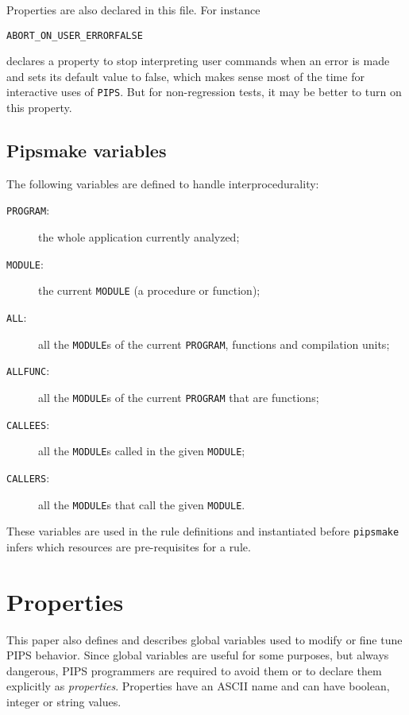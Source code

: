 \documentclass[a4paper]{report}
\begin{document}
Properties are also declared in this file. For instance
\begin{alltt}
ABORT_ON_USER_ERROR FALSE
\end{alltt}
declares a property to stop interpreting user commands when an error
is made and sets its default value to false, which makes sense most of
the time for interactive uses of {\tt PIPS}. But for non-regression
tests, it may be better to turn on this property.

\subsection{Pipsmake variables}
\label{sec:program-pieces}


The following variables are defined to handle interprocedurality:
\begin{description}
\item[\texttt{PROGRAM}:] the whole application currently analyzed;
\item[\texttt{MODULE}:] the current \texttt{MODULE} (a procedure or
  function);
\item[\texttt{ALL}:] all the \texttt{MODULE}s of the current
  \texttt{PROGRAM}, functions and compilation units;
\item[\texttt{ALLFUNC}:] all the \texttt{MODULE}s of the current
  \texttt{PROGRAM} that are functions;
\item[\texttt{CALLEES}:] all the \texttt{MODULE}s called in the given
  \texttt{MODULE};
\item[\texttt{CALLERS}:] all the \texttt{MODULE}s that call the given
  \texttt{MODULE}.
\end{description}

These variables are used in the rule definitions and instantiated
before {\tt pipsmake} infers which resources are pre-requisites for a
rule.


\section{Properties}

This paper also defines and describes global variables used to modify
or fine tune PIPS behavior. Since global variables are useful for some
purposes, but always dangerous, PIPS programmers are required to avoid
them or to declare them explicitly as \emph{properties}. Properties
have an ASCII name and can have boolean, integer or string values.

\end{document}
